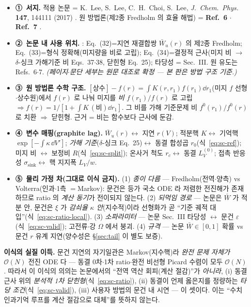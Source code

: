 \begin{itemize}[leftmargin=1.7em,itemsep=0.4em,label={}]
\item \textbf{①\ 서지.} 적용 논문 = K.~Lee, S.~Lee, C.~H.~Choi, S.~Lee, \emph{J.\ Chem.\ Phys.} \textbf{147}, 144111 (2017)
  \cite{lee2017jcp}. 원 방법론(제2종 Fredholm 의 효율 해법) = \textbf{Ref.~6} \cite{lee2011jcp}$\cdot$\textbf{Ref.~7} \cite{son2013jcp}.
\item \textbf{②\ 논문 내 사용 위치.} \cite{lee2017jcp}: Eq.~(32)=지연 재결합쌍 $\bar W_u(r)$ 의 제2종 Fredholm; Eq.~(33)=형식
  정확해(미지량을 비로 고립); Eq.~(34)=결정적 근사(미지 비 $\to$ $\delta$-싱크 가해기준 비 Eqs.~37$\cdot$38, 닫힌형
  Eq.~25); 타당성 = Sec.~III. 원 유도는 Refs.~6$\cdot$7. \emph{(페이지$\cdot$문단 세부는 원문 대조로 확정 --- 본 판은 방법
  구조 기준.)}
\item \textbf{③\ 원 방법론 수학 구조.} $[\text{상수}]-f(r)=\int K(r,r_1)f(r_1)\dd r_1$(미지 $f$ 선형$\cdot$상수원)에서
  $f(r)$ 로 나눠 미지를 \emph{비} $f(r_1)/f(r)$ 로 고립 $\Rightarrow f(r)=1/[1+\int K\,(\text{비})\dd r_1]$. 그 비를 가해
  기준문제 비 $f^0(r_1)/f^0(r)$ 로 치환 $\Rightarrow$ 닫힌형. 근거 = 비는 함수보다 근사에 둔감.
\item \textbf{④\ 변수 매핑(graphite lag).} $\bar W_u(r)\leftrightarrow$ 지연 $r(V)$; 적분핵 $K\leftrightarrow$ 기억핵
  $\exp[-\int\kappa\,\dd V']$; \emph{가해 기준}($\delta$-싱크 Eq.~25)$\leftrightarrow$ 동결 합성곱 $r_0$(식~\eqref{eq:sc-ref});
  미지 비 $\leftrightarrow$ 보정비 $R$(식~\eqref{eq:sc-split}); 온사거 척도 $r_c\leftrightarrow$ 동결 $L_V^{(0)}$; 접촉 반응성
  $\sigma_{\text{sink}}\leftrightarrow$ 핵 지지폭 $L_V/w$.
\item \textbf{⑤\ 물리 가정 차(그대로 이식 금지).} (1) \emph{종이 다름} --- Fredholm(전역$\cdot$양측) vs Volterra(인과$\cdot$1측
  $=$Markov): 문건은 등가 국소 ODE 라 저렴한 전진해가 존재하므로 ratio 의 \emph{계산 동기}가 전이되지 않는다. (2)
  \emph{되먹임 경로} --- 논문은 $\bar W$ 가 적분 안, 문건은 $\xi$ 가 \emph{감쇠율 $\kappa$ 안}(지수적)이라 선형화가 곧
  ``기준 궤적 대입''(식~\eqref{eq:sc-ratio-local}). (3) \emph{소파라미터} --- 논문 Sec.~III 타당성 $\leftrightarrow$ 문건
  $\varepsilon$(식~\eqref{eq:sc-valid}); 고전류$\cdot$강 $\Omega$ 에서 붕괴. (4) \emph{규격} --- 논문 $\bar W\in[0,1]$ 확률 vs
  문건 $r$ 유계 지연(양수성은 \S\ref{sec:tail} 이 별도 보증).
\end{itemize}

\begin{keybox}
\textbf{이식의 실질 이득.} 문건 지연의 자기일관은 Markov(지수핵)라 \emph{완전 문제 자체가} $\mathcal O(N)$ 전진 ODE 다
--- 동결 0차$\cdot$1차 ratio$\cdot$완전 비선형 Picard 수렴이 모두 $\mathcal O(N)$. 따라서 이 이식의 의의는 논문에서의
``전역 역산 회피(계산 절감)''가 \emph{아니라}, (i) 동결 근사 위의 \emph{분석적 1차 닫힌형}(식~\eqref{eq:sc-ratio}),
(ii) 동결이 언제 옳은지를 정량하는 \emph{타당 조건}(식~\eqref{eq:sc-valid}), (iii) 사용자 방법의 문건 내 시연 ---
이 셋이다. 이는 ``수치 인과기억 루프를 계산 절감으로 대체''를 뜻하지 않는다.
\end{keybox}

